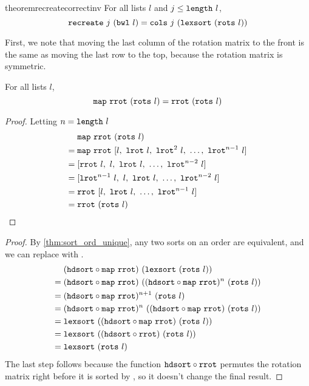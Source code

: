 \documentclass[sigplan,10pt,anonymous,review]{thesis}
\begin{document}
\begin{restatable*}{theorem}{recreatecorrectinv}
  For all lists $l$ and $j \le \texttt{\textup{length}}~l$,
  \begin{equation*}
  \texttt{\textup{recreate}}~j~(\texttt{\textup{bwl}}~l) = \texttt{\textup{cols}}~j~(\texttt{\textup{lexsort}}~(\texttt{\textup{rots}}~l))
  \end{equation*}
\end{restatable*}

First, we note that moving the last column of the rotation matrix to
the front is the same as moving the last row to the top, because the
rotation matrix is symmetric.
\begin{lemma}
  For all lists $l$,
  \begin{equation*}
    \texttt{\textup{map}}~\texttt{\textup{rrot}}~(\texttt{\textup{rots}}~l) = \texttt{\textup{rrot}}~(\texttt{\textup{rots}}~l)
  \end{equation*}
\end{lemma}
\begin{proof}
  Letting $n = \texttt{\textup{length}}~l$
  \begin{align*}
       &\texttt{\textup{map}}~\texttt{\textup{rrot}}~(\texttt{\textup{rots}}~l) \\
    ={}&\texttt{\textup{map}}~\texttt{\textup{rrot}}~[l,~\texttt{\textup{lrot}}~l,~\texttt{\textup{lrot}}^2~l,~\ldots,~\texttt{\textup{lrot}}^{n-1}~l] \\
    ={}&[\texttt{\textup{rrot}}~l,~l,~\texttt{\textup{lrot}}~l,~\ldots,~\texttt{\textup{lrot}}^{n-2}~l] \\
    ={}&[\texttt{\textup{lrot}}^{n-1}~l,~l,~\texttt{\textup{lrot}}~l,~\ldots,~\texttt{\textup{lrot}}^{n-2}~l] \\
    ={}&\texttt{\textup{rrot}}~[l,~\texttt{\textup{lrot}}~l,~\ldots,~\texttt{\textup{lrot}}^{n-1}~l] \\
    ={}&\texttt{\textup{rrot}}~(\texttt{\textup{rots}}~l) \qedhere
  \end{align*}
\end{proof}

\lexsrotrotshdsort
\begin{proof}
  By \cref{thm:sort_ord_unique}, any two sorts on an order are
  equivalent, and we can replace  with .
  \begin{align*}
       &(\texttt{\textup{hdsort}} \circ \texttt{\textup{map}}~\texttt{\textup{rrot}})~(\texttt{\textup{lexsort}}~(\texttt{\textup{rots}}~l)) \\
    ={}&(\texttt{\textup{hdsort}} \circ \texttt{\textup{map}}~\texttt{\textup{rrot}})~((\texttt{\textup{hdsort}} \circ \texttt{\textup{map}}~\texttt{\textup{rrot}})^n~(\texttt{\textup{rots}}~l)) \\
    ={}&(\texttt{\textup{hdsort}} \circ \texttt{\textup{map}}~\texttt{\textup{rrot}})^{n+1}~(\texttt{\textup{rots}}~l) \\
    ={}&(\texttt{\textup{hdsort}} \circ \texttt{\textup{map}}~\texttt{\textup{rrot}})^n~((\texttt{\textup{hdsort}} \circ \texttt{\textup{map}}~\texttt{\textup{rrot}})~(\texttt{\textup{rots}}~l)) \\
    ={}&\texttt{\textup{lexsort}}~((\texttt{\textup{hdsort}} \circ \texttt{\textup{map}}~\texttt{\textup{rrot}})~(\texttt{\textup{rots}}~l)) \\
    ={}&\texttt{\textup{lexsort}}~((\texttt{\textup{hdsort}} \circ \texttt{\textup{rrot}})~(\texttt{\textup{rots}}~l)) \\
    ={}&\texttt{\textup{lexsort}}~(\texttt{\textup{rots}}~l)
  \end{align*}
  The last step follows because the function $\texttt{\textup{hdsort}} \circ
  \texttt{\textup{rrot}}$ permutes the rotation matrix right before it is sorted
  by , so it doesn't change the final result.
\end{proof}
\end{document}
